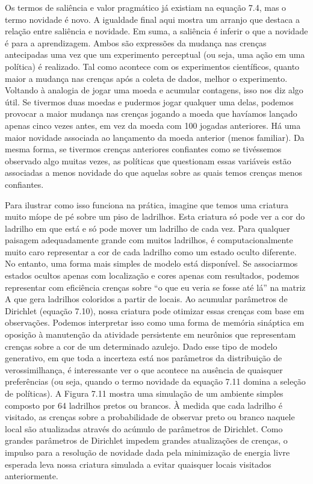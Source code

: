 \documentclass[
  12pt,
]{book}
\begin{document}
Os termos de saliência e valor pragmático já existiam na equação 7.4, mas o termo novidade é novo. A igualdade final aqui mostra um arranjo que destaca a relação entre saliência e novidade. Em suma, a saliência é inferir o que a novidade é para a aprendizagem. Ambos são expressões da mudança nas crenças antecipadas uma vez que um experimento perceptual (ou seja, uma ação em uma política) é realizado. Tal como acontece com os experimentos científicos, quanto maior a mudança nas crenças após a coleta de dados, melhor o experimento. Voltando à analogia de jogar uma moeda e acumular contagens, isso nos diz algo útil. Se tivermos duas moedas e pudermos jogar qualquer uma delas, podemos provocar a maior mudança nas crenças jogando a moeda que havíamos lançado apenas cinco vezes antes, em vez da moeda com 100 jogadas anteriores. Há uma maior novidade associada ao lançamento da moeda anterior (menos familiar). Da mesma forma, se tivermos crenças anteriores confiantes como se tivéssemos observado algo muitas vezes, as políticas que questionam essas variáveis \hspace{0pt}\hspace{0pt}estão associadas a menos novidade do que aquelas sobre as quais temos crenças menos confiantes.

Para ilustrar como isso funciona na prática, imagine que temos uma criatura muito míope de pé sobre um piso de ladrilhos. Esta criatura só pode ver a cor do ladrilho em que está e só pode mover um ladrilho de cada vez. Para qualquer paisagem adequadamente grande com muitos ladrilhos, é computacionalmente muito caro representar a cor de cada ladrilho como um estado oculto diferente. No entanto, uma forma mais simples de modelo está disponível. Se associarmos estados ocultos apenas com localização e cores apenas com resultados, podemos representar com eficiência crenças sobre ``o que eu veria se fosse até lá'' na matriz A que gera ladrilhos coloridos a partir de locais. Ao acumular parâmetros de Dirichlet (equação 7.10), nossa criatura pode otimizar essas crenças com base em observações. Podemos interpretar isso como uma forma de memória sináptica em oposição à manutenção da atividade persistente em neurônios que representam crenças sobre a cor de um determinado azulejo. Dado esse tipo de modelo generativo, em que toda a incerteza está nos parâmetros da distribuição de verossimilhança, é interessante ver o que acontece na ausência de quaisquer preferências (ou seja, quando o termo novidade da equação 7.11 domina a seleção de políticas). A Figura 7.11 mostra uma simulação de um ambiente simples composto por 64 ladrilhos pretos ou brancos. À medida que cada ladrilho é visitado, as crenças sobre a probabilidade de observar preto ou branco naquele local são atualizadas através do acúmulo de parâmetros de Dirichlet. Como grandes parâmetros de Dirichlet impedem grandes atualizações de crenças, o impulso para a resolução de novidade dada pela minimização de energia livre esperada leva nossa criatura simulada a evitar quaisquer locais visitados anteriormente.
\end{document}
